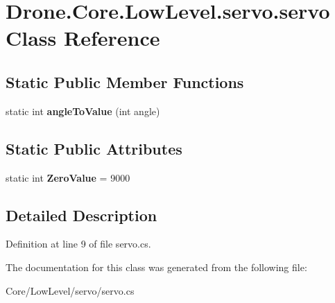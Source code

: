 \hypertarget{class_drone_1_1_core_1_1_low_level_1_1servo_1_1servo}{}\section{Drone.\+Core.\+Low\+Level.\+servo.\+servo Class Reference}
\label{class_drone_1_1_core_1_1_low_level_1_1servo_1_1servo}
\subsection*{Static Public Member Functions}
\begin{DoxyCompactItemize}
\item 
\hypertarget{class_drone_1_1_core_1_1_low_level_1_1servo_1_1servo_ab3d4aad940a0e624ddbc6948ff316e2d}{}static int {\bfseries angle\+To\+Value} (int angle)\label{class_drone_1_1_core_1_1_low_level_1_1servo_1_1servo_ab3d4aad940a0e624ddbc6948ff316e2d}

\end{DoxyCompactItemize}
\subsection*{Static Public Attributes}
\begin{DoxyCompactItemize}
\item 
\hypertarget{class_drone_1_1_core_1_1_low_level_1_1servo_1_1servo_a22e77eab42551cd1d841ab7e2202ffc1}{}static int {\bfseries Zero\+Value} = 9000\label{class_drone_1_1_core_1_1_low_level_1_1servo_1_1servo_a22e77eab42551cd1d841ab7e2202ffc1}

\end{DoxyCompactItemize}


\subsection{Detailed Description}


Definition at line 9 of file servo.\+cs.



The documentation for this class was generated from the following file\+:\begin{DoxyCompactItemize}
\item 
Core/\+Low\+Level/servo/servo.\+cs\end{DoxyCompactItemize}

